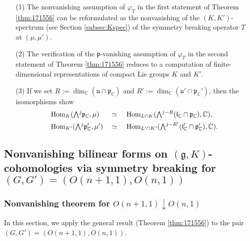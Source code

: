 \begin{remark}
\label{rem:cohKK}
\begin{enumerate}
\item[{\rm{(1)}}]
The nonvanishing assumption of $\varphi_T$
 in the first statement of Theorem \ref{thm:171556}
 can be reformulated as the nonvanishing
 of the 
 $(K,K')$-spectrum
 (see Section \ref{subsec:Kspec})
 of the symmetry breaking operator $T$
at $(\mu,\mu')$.  
\item[{\rm{(2)}}]
The verification of the ${\mathfrak{p}}$-vanishing assumption
 of $\varphi_T$ in the second statement of Theorem \ref{thm:171556} 
 reduces to a computation
 of finite-dimensional representations
 of compact Lie groups $K$ and $K'$.  
\item[{\rm{(3)}}]
If we set $R:=\dim_{\mathbb{C}}({\mathfrak{u}} \cap {\mathfrak{p}}_{\mathbb{C}})$
 and $R':=\dim_{\mathbb{C}}({\mathfrak{u}}'\cap {\mathfrak{p}}_{\mathbb{C}}')$,
 then the isomorphisms \cite[Cor.~3.7]{VZ} show
\begin{alignat*}{3}
&{\operatorname{Hom}}_{K}(\Exterior^j {\mathfrak{p}}_{\mathbb{C}},\mu)
   &&\simeq \,\,
   &&{\operatorname{Hom}}_{L \cap K}(\Exterior^{j-R} ({\mathfrak{l}}_{\mathbb{C}} \cap {\mathfrak{p}}_{\mathbb{C}}),{\mathbb{C}}), 
\\
  &{\operatorname{Hom}}_{K'}(\Exterior^j {\mathfrak{p}}_{\mathbb{C}}',\mu')
   &&\simeq
   &&{\operatorname{Hom}}_{L' \cap K'}(\Exterior^{j-R'}
   ({\mathfrak{l}}_{\mathbb{C}}' \cap {\mathfrak{p}}_{\mathbb{C}}'),{\mathbb{C}}).  
\end{alignat*}
\end{enumerate}
\end{remark}

\subsection{Nonvanishing bilinear forms on $(\mathfrak{g}, K)$-cohomologies
 via symmetry breaking for $(G,G')=(O(n+1,1),O(n,1))$}
\label{subsec:cohgkex}
\subsubsection{Nonvanishing theorem for $O(n+1,1) \downarrow O(n,1)$}
\label{subsec:cohbi}
In this section,
 we apply the general result
 (Theorem \ref{thm:171556})
 to the pair $(G,G')=(O(n+1,1),O(n,1))$.  



